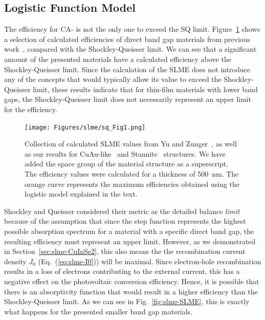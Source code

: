 \begin{refsection}
\subsection{Logistic Function Model} \label{sec:slme-logistic}

The efficiency for CA- is not the only one to exceed the SQ limit. Figure~\ref{fig:slme-logistic} shows a selection of calculated efficiencies of direct band gap materials from previous work~\cite{Yu2012, Bercx2016, Sarmadian2016}, compared with the Shockley-Queisser limit.  We can see that a significant amount of the presented materials have a calculated efficiency above the Shockley-Queisser limit. Since the calculation of the SLME does not introduce any of the concepts that would typically allow its value to exceed the Shockley-Queisser limit, these results indicate that for thin-film materials with lower band gaps, the Shockley-Queisser limit does not necessarily represent an upper limit for the efficiency.

\begin{figure}[h]
\centering
\texttt{[image: Figures/slme/sq\_Fig1.png]}
\caption{Collection of calculated SLME values from Yu and Zunger~\cite{Yu2012}, as well as our results for CuAu-like~\cite{Bercx2016} and Stannite~\cite{Sarmadian2016} structures. We have added the space group of the material structure as a superscript. The efficiency values were calculated for a thickness of 500~\si{\nano\meter}. The orange curve represents the maximum efficiencies obtained using the logistic model explained in the text.}
\label{fig:slme-logistic}
\end{figure}

Shockley and Queisser considered their metric as the detailed balance \textit{limit} because of the assumption that since the step function represents the highest possible absorption spectrum for a material with a specific direct band gap, the resulting efficiency must represent an upper limit. However, as we demonstrated in Section~\ref{sec:slme-CuInSe2}, this also means the the recombination current density $J_0$ (Eq.~(\ref{eq:slme-I0})) will be maximal. Since electron-hole recombination results in a loss of electrons contributing to the external current, this has a negative effect on the photovoltaic conversion efficiency. Hence, it is possible that there is an absorptivity function that would result in a higher efficiency than the Shockley-Queisser limit. As we can see in Fig.~\ref{fig:slme-SLME}, this is exactly what happens for the presented smaller band gap materials.


\end{refsection}
